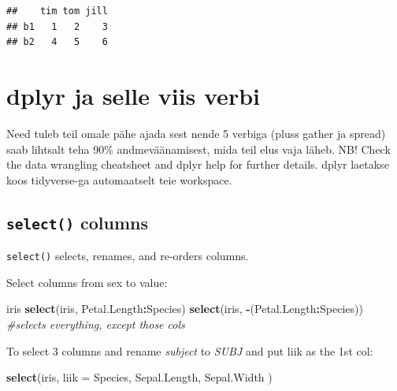 \documentclass[]{book}
\newenvironment{Shaded}{\begin{snugshade}}{\end{snugshade}}
\newcommand{\KeywordTok}[1]{\textcolor[rgb]{0.13,0.29,0.53}{\textbf{#1}}}
\newcommand{\DataTypeTok}[1]{\textcolor[rgb]{0.13,0.29,0.53}{#1}}
\newcommand{\DecValTok}[1]{\textcolor[rgb]{0.00,0.00,0.81}{#1}}
\newcommand{\StringTok}[1]{\textcolor[rgb]{0.31,0.60,0.02}{#1}}
\newcommand{\CommentTok}[1]{\textcolor[rgb]{0.56,0.35,0.01}{\textit{#1}}}
\newcommand{\OperatorTok}[1]{\textcolor[rgb]{0.81,0.36,0.00}{\textbf{#1}}}
\newcommand{\NormalTok}[1]{#1}
\begin{document}
\begin{Shaded}
\end{Shaded}

\begin{verbatim}
##    tim tom jill
## b1   1   2    3
## b2   4   5    6
\end{verbatim}

\section{dplyr ja selle viis verbi}\label{dplyr-ja-selle-viis-verbi}

Need tuleb teil omale pähe ajada sest nende 5 verbiga (pluss gather ja
spread) saab lihtsalt teha 90\% andmeväänamisest, mida teil elus vaja
läheb. NB! Check the data wrangling cheatsheet and dplyr help for
further details. dplyr laetakse koos tidyverse-ga automaatselt teie
workspace.

\subsection{\texorpdfstring{\texttt{select()}
columns}{select() columns}}\label{select-columns}

\texttt{select()} selects, renames, and re-orders columns.

Select columns from sex to value:

\begin{Shaded}
\begin{Highlighting}[]
\NormalTok{iris}
\KeywordTok{select}\NormalTok{(iris, Petal.Length}\OperatorTok{:}\NormalTok{Species)}
\KeywordTok{select}\NormalTok{(iris, }\OperatorTok{-}\NormalTok{(Petal.Length}\OperatorTok{:}\NormalTok{Species)) }\CommentTok{#selects everything, except those cols}
\end{Highlighting}
\end{Shaded}

To select 3 columns and rename \emph{subject} to \emph{SUBJ} and put
liik as the 1st col:

\begin{Shaded}
\begin{Highlighting}[]
\KeywordTok{select}\NormalTok{(iris, }\DataTypeTok{liik =}\NormalTok{ Species, Sepal.Length, Sepal.Width )}
\end{Highlighting}
\end{Shaded}
\end{document}
